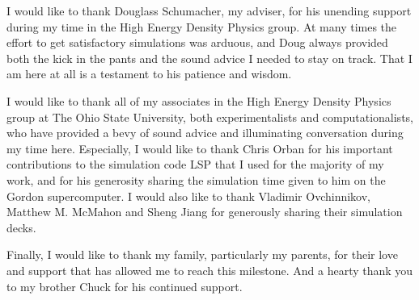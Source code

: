 \begin{acknowledgments}

I would like to thank Douglass Schumacher, my adviser, for his unending support during my time in the High Energy Density Physics group.  At many times the effort to get satisfactory simulations was arduous, and Doug always provided both the kick in the pants and the sound advice I needed to stay on track.  That I am here at all is a testament to his patience and wisdom.

I would like to thank all of my associates in the High Energy Density Physics group at The Ohio State University, both experimentalists and computationalists, who have provided a bevy of sound advice and illuminating conversation during my time here.  Especially, I would like to thank Chris Orban for his important contributions to the simulation code LSP that I used for the majority of my work, and for his generosity sharing the simulation time given to him on the Gordon supercomputer.  I would also like to thank Vladimir Ovchinnikov, Matthew M. McMahon and Sheng Jiang for generously sharing their simulation decks.

Finally, I would like to thank my family, particularly my parents, for their love and support that has allowed me to reach this milestone.  And a hearty thank you to my brother Chuck for his continued support.
\end{acknowledgments}
